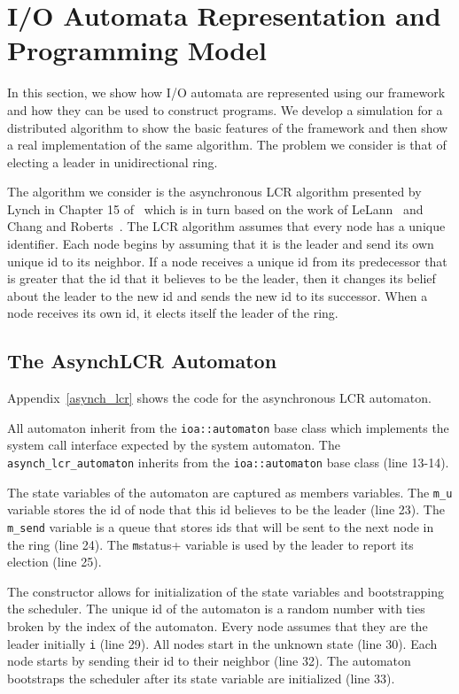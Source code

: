 \section{I/O Automata Representation and Programming Model\label{representation}}

In this section, we show how I/O automata are represented using our framework and how they can be used to construct programs.
We develop a simulation for a distributed algorithm to show the basic features of the framework and then show a real implementation of the same algorithm.
The problem we consider is that of electing a leader in unidirectional ring.

The algorithm we consider is the asynchronous LCR algorithm presented by Lynch in Chapter 15 of~\cite{lynch1996distributed} which is in turn based on the work of LeLann~\cite{} and Chang and Roberts~\cite{}.
The LCR algorithm assumes that every node has a unique identifier.
Each node begins by assuming that it is the leader and send its own unique id to its neighbor.
If a node receives a unique id from its predecessor that is greater that the id that it believes to be the leader, then it changes its belief about the leader to the new id and sends the new id to its successor.
When a node receives its own id, it elects itself the leader of the ring.

\subsection{The AsynchLCR Automaton}

Appendix~\ref{asynch_lcr} shows the code for the asynchronous LCR automaton.

All automaton inherit from the \verb+ioa::automaton+ base class which implements the system call interface expected by the system automaton.
The \verb+asynch_lcr_automaton+ inherits from the \verb+ioa::automaton+ base class (line 13-14).

The state variables of the automaton are captured as members variables.
The \verb+m_u+ variable stores the id of node that this id believes to be the leader (line 23).
The \verb+m_send+ variable is a queue that stores ids that will be sent to the next node in the ring (line 24).
The \verb+m+status+ variable is used by the leader to report its election (line 25).

The constructor allows for initialization of the state variables and bootstrapping the scheduler.
The unique id of the automaton is a random number with ties broken by the index of the automaton.
Every node assumes that they are the leader initially \verb+i+ (line 29).
All nodes start in the unknown state (line 30).
Each node starts by sending their id to their neighbor (line 32).
The automaton bootstraps the scheduler after its state variable are initialized (line 33).

